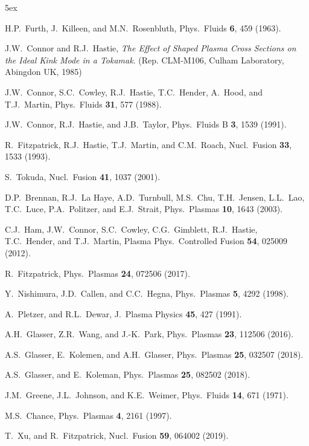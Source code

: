 \documentclass[12pt,prb,aps]{revtex4-1}
\begin{document}
\begin{thebibliography}{99}\baselineskip 5ex

 H.P.~Furth,  J.~Killeen, and M.N.~Rosenbluth,  Phys.\ Fluids {\bf 6}, 459 (1963).

 J.W.~Connor and R.J.~Hastie, {\em The Effect of Shaped Plasma Cross Sections on the Ideal Kink Mode in a Tokamak}. (Rep. CLM-M106, Culham Laboratory, Abingdon UK, 1985)

 J.W.~Connor,  S.C.~Cowley, R.J.~Hastie,  T.C.~Hender,  A.~Hood, and T.J.~Martin,  Phys.\ Fluids {\bf 31}, 577 (1988).

 J.W.~Connor, R.J.~Hastie, and J.B.~Taylor, Phys.\ Fluids B {\bf 3}, 1539 (1991).

 R.~Fitzpatrick, R.J.~Hastie, T.J.~Martin, and C.M.~Roach, Nucl.\ Fusion {\bf 33}, 1533 (1993).

 S.~Tokuda, Nucl.\ Fusion {\bf 41}, 1037 (2001).

 D.P.~Brennan, R.J.~La Haye, A.D.~Turnbull, M.S.~Chu, T.H.~Jensen, L.L.~Lao, T.C.~Luce, P.A.~Politzer, and E.J.~Strait, Phys.\ Plasmas {\bf 10}, 1643 (2003).

 C.J.~Ham, J.W.~Connor, S.C.~Cowley, C.G.~Gimblett, R.J.~Hastie, T.C.~Hender, and T.J.~Martin, Plasma Phys.\ Controlled Fusion {\bf 54}, 025009 (2012). 

 R.~Fitzpatrick, Phys.\ Plasmas {\bf 24}, 072506 (2017). 

 Y.~Nishimura, J.D.~Callen, and C.C.~Hegna, Phys.\ Plasmas {\bf 5}, 4292 (1998).

 A.~Pletzer, and R.L.~Dewar, J.\ Plasma Physics {\bf 45}, 427 (1991).

 A.H.~Glasser, Z.R.~Wang, and J.-K.~Park, Phys.\ Plasmas {\bf 23}, 112506 (2016).

 A.S.~Glasser, E.~Kolemen, and A.H.~Glasser, Phys.\ Plasmas {\bf 25}, 032507 (2018).

 A.S.~Glasser, and E.~Koleman, Phys.\ Plasmas {\bf 25}, 082502 (2018). 

 J.M.~Greene, J.L.~Johnson, and K.E.~Weimer,  Phys.\  Fluids  {\bf 14}, 671 (1971).

 M.S.~Chance, Phys.\ Plasmas {\bf 4}, 2161 (1997).

 T.~Xu, and R.~Fitzpatrick, Nucl.\ Fusion {\bf 59}, 064002 (2019).


\end{thebibliography}
\end{document}
